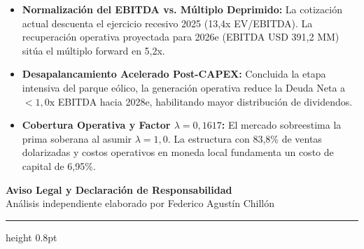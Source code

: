 \documentclass[11pt,a4paper]{article}
\begin{document}
\vspace{0.15cm}
\noindent
\begin{tcolorbox}[colback=white, colframe=gsblue!40, boxrule=0.5pt, top=2pt, bottom=2pt, left=4pt, right=4pt, title={\small\sffamily \textbf{Divergencias Frente al Consenso de Mercado}}, coltitle=gsnavy]
    \footnotesize
    \begin{itemize}
        \setlength{\itemsep}{0pt}
        \item \textbf{Normalización del EBITDA vs. Múltiplo Deprimido:} La cotización actual descuenta el ejercicio recesivo 2025 (13,4x EV/EBITDA). La recuperación operativa proyectada para 2026e (EBITDA USD 391,2 MM) sitúa el múltiplo forward en 5,2x.
        \item \textbf{Desapalancamiento Acelerado Post-CAPEX:} Concluida la etapa intensiva del parque eólico, la generación operativa reduce la Deuda Neta a $<1,0\text{x}$ EBITDA hacia 2028e, habilitando mayor distribución de dividendos.
        \item \textbf{Cobertura Operativa y Factor $\lambda = 0,1617$:} El mercado sobreestima la prima soberana al asumir $\lambda=1,0$. La estructura con 83,8\% de ventas dolarizadas y costos operativos en moneda local fundamenta un costo de capital de 6,95\%.
    \end{itemize}
\end{tcolorbox}

\clearpage


\begin{center}
    {\Large\georgiahead\bfseries\color{gsnavy} Aviso Legal y Declaración de Responsabilidad} \\[0.2cm]
    {\small\color{gsgray} Análisis independiente elaborado por Federico Agustín Chillón}
\end{center}
\vspace{0.05cm}
\hrule height 0.8pt
\vspace{0.15cm}
\end{document}
